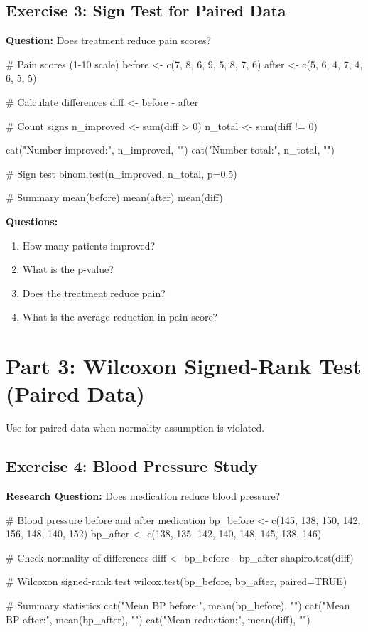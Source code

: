 \documentclass[11pt]{article}
\begin{document}
\vspace{1cm}

\subsection{Exercise 3: Sign Test for Paired Data}

\textbf{Question:} Does treatment reduce pain scores?

\begin{rcode}
# Pain scores (1-10 scale)
before <- c(7, 8, 6, 9, 5, 8, 7, 6)
after <- c(5, 6, 4, 7, 4, 6, 5, 5)

# Calculate differences
diff <- before - after

# Count signs
n_improved <- sum(diff > 0)
n_total <- sum(diff != 0)

cat("Number improved:", n_improved, "\n")
cat("Number total:", n_total, "\n")

# Sign test
binom.test(n_improved, n_total, p=0.5)

# Summary
mean(before)
mean(after)
mean(diff)
\end{rcode}

\textbf{Questions:}
\begin{enumerate}
\item How many patients improved?
\item What is the p-value?
\item Does the treatment reduce pain?
\item What is the average reduction in pain score?
\end{enumerate}

\vspace{1cm}

\section{Part 3: Wilcoxon Signed-Rank Test (Paired Data)}

Use for paired data when normality assumption is violated.

\subsection{Exercise 4: Blood Pressure Study}

\textbf{Research Question:} Does medication reduce blood pressure?

\begin{rcode}
# Blood pressure before and after medication
bp_before <- c(145, 138, 150, 142, 156, 148, 140, 152)
bp_after <- c(138, 135, 142, 140, 148, 145, 138, 146)

# Check normality of differences
diff <- bp_before - bp_after
shapiro.test(diff)

# Wilcoxon signed-rank test
wilcox.test(bp_before, bp_after, paired=TRUE)

# Summary statistics
cat("Mean BP before:", mean(bp_before), "\n")
cat("Mean BP after:", mean(bp_after), "\n")
cat("Mean reduction:", mean(diff), "\n")
\end{rcode}
\end{document}
